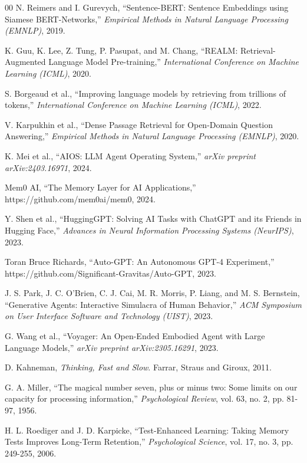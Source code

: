 \documentclass[conference]{IEEEtran}
\begin{document}
\begin{thebibliography}{00}
 N. Reimers and I. Gurevych, ``Sentence-BERT: Sentence Embeddings using Siamese BERT-Networks,'' \textit{Empirical Methods in Natural Language Processing (EMNLP)}, 2019.

 K. Guu, K. Lee, Z. Tung, P. Pasupat, and M. Chang, ``REALM: Retrieval-Augmented Language Model Pre-training,'' \textit{International Conference on Machine Learning (ICML)}, 2020.

 S. Borgeaud et al., ``Improving language models by retrieving from trillions of tokens,'' \textit{International Conference on Machine Learning (ICML)}, 2022.

 V. Karpukhin et al., ``Dense Passage Retrieval for Open-Domain Question Answering,'' \textit{Empirical Methods in Natural Language Processing (EMNLP)}, 2020.

 K. Mei et al., ``AIOS: LLM Agent Operating System,'' \textit{arXiv preprint arXiv:2403.16971}, 2024.

 Mem0 AI, ``The Memory Layer for AI Applications,'' https://github.com/mem0ai/mem0, 2024.

 Y. Shen et al., ``HuggingGPT: Solving AI Tasks with ChatGPT and its Friends in Hugging Face,'' \textit{Advances in Neural Information Processing Systems (NeurIPS)}, 2023.

 Toran Bruce Richards, ``Auto-GPT: An Autonomous GPT-4 Experiment,'' https://github.com/Significant-Gravitas/Auto-GPT, 2023.

 J. S. Park, J. C. O'Brien, C. J. Cai, M. R. Morris, P. Liang, and M. S. Bernstein, ``Generative Agents: Interactive Simulacra of Human Behavior,'' \textit{ACM Symposium on User Interface Software and Technology (UIST)}, 2023.

 G. Wang et al., ``Voyager: An Open-Ended Embodied Agent with Large Language Models,'' \textit{arXiv preprint arXiv:2305.16291}, 2023.

 D. Kahneman, \textit{Thinking, Fast and Slow}. Farrar, Straus and Giroux, 2011.

 G. A. Miller, ``The magical number seven, plus or minus two: Some limits on our capacity for processing information,'' \textit{Psychological Review}, vol. 63, no. 2, pp. 81-97, 1956.

 H. L. Roediger and J. D. Karpicke, ``Test-Enhanced Learning: Taking Memory Tests Improves Long-Term Retention,'' \textit{Psychological Science}, vol. 17, no. 3, pp. 249-255, 2006.


\end{thebibliography}
\end{document}
